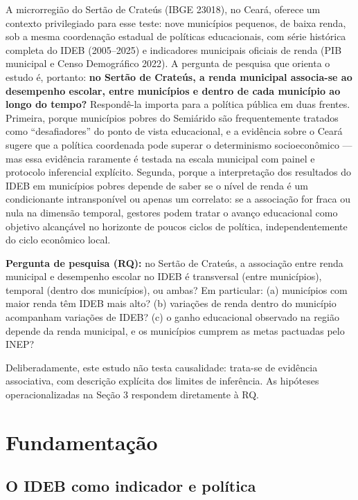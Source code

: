 \documentclass[12pt,a4paper]{article}
\begin{document}
A microrregião do Sertão de Crateús (IBGE 23018), no Ceará, oferece um contexto privilegiado para esse teste: nove municípios pequenos, de baixa renda, sob a mesma coordenação estadual de políticas educacionais, com série histórica completa do IDEB (2005--2025) e indicadores municipais oficiais de renda (PIB municipal e Censo Demográfico 2022).
A pergunta de pesquisa que orienta o estudo é, portanto: \textbf{no Sertão de Crateús, a renda municipal associa-se ao desempenho escolar, entre municípios e dentro de cada município ao longo do tempo?} Respondê-la importa para a política pública em duas frentes. Primeira, porque municípios pobres do Semiárido são frequentemente tratados como ``desafiadores'' do ponto de vista educacional, e a evidência sobre o Ceará sugere que a política coordenada pode superar o determinismo socioeconômico --- mas essa evidência raramente é testada na escala municipal com painel e protocolo inferencial explícito. Segunda, porque a interpretação dos resultados do IDEB em municípios pobres depende de saber se o nível de renda é um condicionante intransponível ou apenas um correlato: se a associação for fraca ou nula na dimensão temporal, gestores podem tratar o avanço educacional como objetivo alcançável no horizonte de poucos ciclos de política, independentemente do ciclo econômico local.


\textbf{Pergunta de pesquisa (RQ):} no Sertão de Crateús, a associação entre renda municipal e desempenho escolar no IDEB é transversal (entre municípios), temporal (dentro dos municípios), ou ambas? Em particular: (a) municípios com maior renda têm IDEB mais alto? (b) variações de renda dentro do município acompanham variações de IDEB? (c) o ganho educacional observado na região depende da renda municipal, e os municípios cumprem as metas pactuadas pelo INEP?

Deliberadamente, este estudo não testa causalidade: trata-se de evidência associativa, com descrição explícita dos limites de inferência. As hipóteses operacionalizadas na Seção 3 respondem diretamente à RQ.

\section{Fundamentação}

\subsection{O IDEB como indicador e política}
\end{document}
